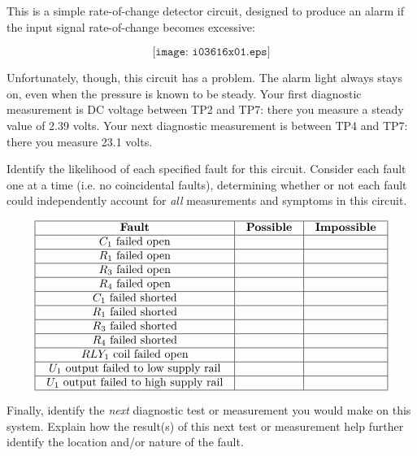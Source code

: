 

This is a simple rate-of-change detector circuit, designed to produce an alarm if the input signal rate-of-change becomes excessive:

$$\texttt{[image: i03616x01.eps]}$$

Unfortunately, though, this circuit has a problem.  The alarm light always stays on, even when the pressure is known to be steady.  Your first diagnostic measurement is DC voltage between TP2 and TP7: there you measure a steady value of 2.39 volts.  Your next diagnostic measurement is between TP4 and TP7: there you measure 23.1 volts.

Identify the likelihood of each specified fault for this circuit.  Consider each fault one at a time (i.e. no coincidental faults), determining whether or not each fault could independently account for {\it all} measurements and symptoms in this circuit.


$$\vbox{\offinterlineskip
\halign{\strut
\vrule \quad\hfil # \ \hfil & 
\vrule \quad\hfil # \ \hfil & 
\vrule \quad\hfil # \ \hfil \vrule \cr
\noalign{\hrule}
%
{\bf Fault} & {\bf Possible} & {\bf Impossible} \cr
%
\noalign{\hrule}
%
$C_1$ failed open &  &  \cr
%
\noalign{\hrule}
%
$R_1$ failed open &  &  \cr
%
\noalign{\hrule}
%
$R_3$ failed open &  &  \cr
%
\noalign{\hrule}
%
$R_4$ failed open &  &  \cr
%
\noalign{\hrule}
%
$C_1$ failed shorted &  &  \cr
%
\noalign{\hrule}
%
$R_1$ failed shorted &  &  \cr
%
\noalign{\hrule}
%
$R_3$ failed shorted &  &  \cr
%
\noalign{\hrule}
%
$R_4$ failed shorted &  &  \cr
%
\noalign{\hrule}
%
$RLY_1$ coil failed open &  &  \cr
%
\noalign{\hrule}
%
$U_1$ output failed to low supply rail &  &  \cr
%
\noalign{\hrule}
%
$U_1$ output failed to high supply rail &  &  \cr
%
\noalign{\hrule}
} %
}$$ %

Finally, identify the {\it next} diagnostic test or measurement you would make on this system.  Explain how the result(s) of this next test or measurement help further identify the location and/or nature of the fault.

